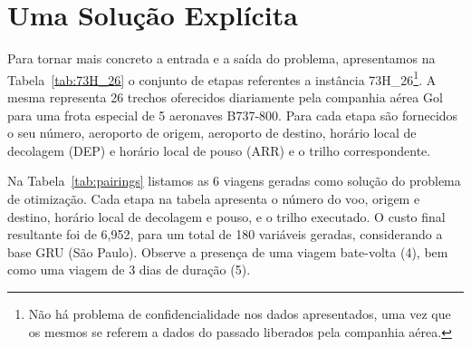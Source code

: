 
\section{Uma Solução Explícita}
\label{sec:solucao_explicita}

Para tornar mais concreto a entrada e a saída do problema, apresentamos na Tabela~\ref{tab:73H_26} o
conjunto de etapas referentes a instância 73H\_26\footnote{Não há problema de confidencialidade nos
dados apresentados, uma vez que os mesmos se referem a dados do passado liberados pela companhia
aérea.}. A mesma representa 26 trechos oferecidos diariamente pela companhia aérea Gol para uma
frota especial de 5 aeronaves B737-800. Para cada etapa são fornecidos o seu número, aeroporto de
origem, aeroporto de destino, horário local de decolagem (DEP) e horário local de pouso (ARR) e o
trilho correspondente.

Na Tabela~\ref{tab:pairings} listamos as 6 viagens geradas como solução do problema de otimização.
Cada etapa na tabela apresenta o número do voo, origem e destino, horário local de decolagem e 
pouso, e o trilho executado. O custo final resultante foi de 6,952, para um total de 180 variáveis 
geradas, considerando a base GRU (São Paulo). Observe a presença de uma viagem bate-volta (4),
bem como uma viagem de 3 dias de duração (5).

